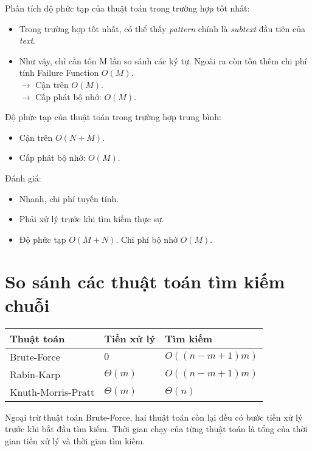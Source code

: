 \documentclass[a4paper,11pt]{article}
\begin{document}
			Phân tích độ phức tạp của thuật toán trong trường hợp tốt nhất:
			\begin{itemize}
				\item Trong trường hợp tốt nhất, có thể thấy \textit{pattern} chính là \textit{subtext} đầu tiên của \textit{text}.
				\item Như vậy, chỉ cần tốn M lần so sánh các ký tự. Ngoài ra còn tốn thêm chi phí tính Failure Function $O(M)$.\\
				$\to$ Cận trên $O(M)$. \\
				$\to$ Cấp phát bộ nhớ: $O(M)$.
			\end{itemize}

			Độ phức tạp của thuật toán trong trường hợp trung bình:
			\begin{itemize}
				\item Cận trên $O(N + M)$.
				\item Cấp phát bộ nhớ: $O(M)$.
			\end{itemize}

			Đánh giá:
			\begin{itemize}
				\item Nhanh, chi phí tuyến tính.
				\item Phải xử lý trước khi tìm kiếm thực sự.
				\item Độ phức tạp $O(M + N)$. Chi phí bộ nhớ $O(M)$.
			\end{itemize}

	\section{So sánh các thuật toán tìm kiếm chuỗi}
\begin{center}
 \begin{tabular}{||m{4cm} | m{4cm} m{4cm}||} 
 \hline
 Thuật toán & Tiền xử lý & Tìm kiếm \\ [1ex] 
 \hline\hline
 Brute-Force & $0$ & $O((n-m+1)m)$ \\ [1ex] 
 \hline
 Rabin-Karp & $\Theta(m)$ & $O((n-m+1)m)$ \\ [1ex] 
 \hline
 Knuth-Morris-Pratt & $\Theta(m)$ & $\Theta(n)$ \\ [1ex] 
 \hline
\end{tabular}
\end{center}

Ngoại trừ thuật toán Brute-Force, hai thuật toán còn lại đều có bước tiền xử lý trước khi bắt đầu tìm kiếm. Thời gian chạy của từng thuật toán là tổng của thời gian tiền xử lý và thời gian tìm kiếm.
\end{document}
